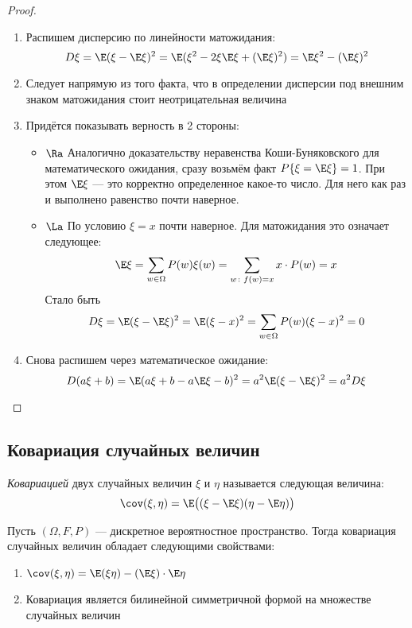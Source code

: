 \begin{proof}~
	\begin{enumerate}
		\item Распишем дисперсию по линейности матожидания:
		\[
			D\xi = \E(\xi - \E\xi)^2 = \E(\xi^2 - 2\xi\E\xi + (\E\xi)^2) = \E\xi^2 - (\E\xi)^2
		\]
		
		\item Следует напрямую из того факта, что в определении дисперсии под внешним знаком матожидания стоит неотрицательная величина
		
		\item Придётся показывать верность в 2 стороны:
		\begin{itemize}
			\item $\Ra$ Аналогично доказательству неравенства Коши-Буняковского для математического ожидания, сразу возьмём факт $P\{\xi = \E\xi\} = 1$. При этом $\E\xi$ --- это корректно определенное какое-то число. Для него как раз и выполнено равенство почти наверное.
			
			\item $\La$ По условию $\xi = x$ почти наверное. Для матожидания это означает следующее:
			\[
				\E\xi = \sum_{w \in \Omega} P(w) \xi(w) = \sum_{w \colon f(w) = x} x \cdot P(w) = x
			\]
			Стало быть
			\[
				D\xi = \E(\xi - \E\xi)^2 = \E(\xi - x)^2 = \sum_{w \in \Omega} P(w)(\xi - x)^2 = 0
			\]
		\end{itemize}
	
		\item Снова распишем через математическое ожидание:
		\[
			D(a\xi + b) = \E(a\xi + b - a\E\xi - b)^2 = a^2\E(\xi - \E\xi)^2 = a^2D\xi
		\]
	\end{enumerate}
\end{proof}

\subsection{Ковариация случайных величин}

\begin{definition}
	\textit{Ковариацией} двух случайных величин $\xi$ и $\eta$ называется следующая величина:
	\[
		\cov(\xi, \eta) = \E\big((\xi - \E\xi)(\eta - \E\eta)\big)
	\]
\end{definition}

\begin{theorem}
	Пусть $(\Omega, F, P)$ --- дискретное вероятностное пространство. Тогда ковариация случайных величин обладает следующими свойствами:
	\begin{enumerate}
		\item \(\cov(\xi, \eta) = \E(\xi\eta) - (\E\xi) \cdot \E\eta\)
		
		\item Ковариация является билинейной симметричной формой на множестве случайных величин
	\end{enumerate}
\end{theorem}

